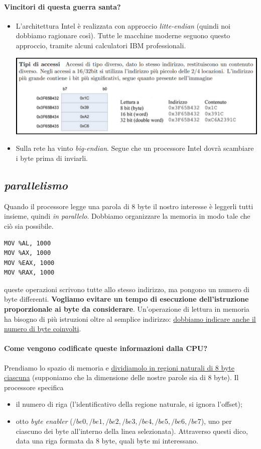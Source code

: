 \documentclass[11pt]{report}
\theoremstyle{definition}
\begin{document}
\paragraph{Vincitori di questa guerra santa?} 
\begin{itemize}
\item L'architettura Intel è realizzata con approccio \emph{litte-endian} (quindi noi dobbiamo ragionare così). Tutte le macchine moderne seguono questo approccio, tramite alcuni calculatori IBM professionali.
\begin{center}
	\includegraphics[scale=.65]{img/133.PNG}
\end{center}
\item Sulla rete ha vinto \emph{big-endian}.  Segue che un processore Intel dovrà scambiare i byte prima di inviarli.
\end{itemize}

\subsection{\emph{parallelismo}}
Quando il processore legge una parola di 8 byte il nostro interesse è leggerli tutti insieme, quindi \emph{in parallelo}. Dobbiamo organizzare la memoria in modo tale che ciò sia possibile.  
\begin{verbatim}
MOV %AL, 1000
MOV %AX, 1000
MOV %EAX, 1000
MOV %RAX, 1000
\end{verbatim}
queste operazioni scrivono tutte allo stesso indirizzo, ma pongono un numero di byte differenti. \textbf{Vogliamo evitare un tempo di esecuzione dell'istruzione proporzionale ai byte da considerare}. Un'operazione di lettura in memoria ha bisogno di più istruzioni oltre al semplice indirizzo: \underline{dobbiamo indicare anche il numero di byte coinvolti}.
\paragraph{Come vengono codificate queste informazioni dalla CPU?} Prendiamo lo spazio di memoria e \underline{dividiamolo in regioni naturali di 8 byte ciascuna} (supponiamo che la dimensione delle nostre parole sia di 8 byte). Il processore specifica 
\begin{itemize}
\item il numero di riga (l'identificativo della regione naturale, si ignora l'offset);
\item otto \emph{byte enabler} ($/be0, /be1, /be2, /be3, /be4, /be5, /be6, /be7$), uno per ciascuno dei byte all'interno della linea selezionata). Attraverso questi dico, data una riga formata da 8 byte, quali byte mi interessano.
\end{itemize}
\end{document}
